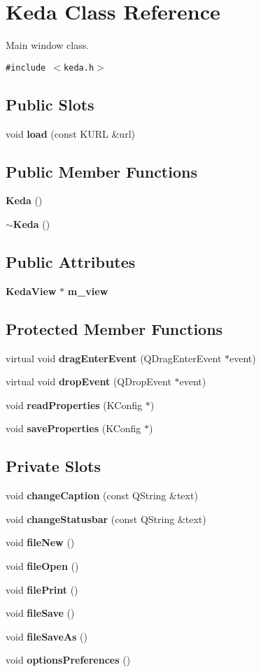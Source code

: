 \section{Keda Class Reference}
\label{classKeda}
Main window class.  


{\tt \#include $<$keda.h$>$}

\subsection*{Public Slots}
\begin{CompactItemize}
\item 
void {\bf load} (const KURL \&url)
\end{CompactItemize}
\subsection*{Public Member Functions}
\begin{CompactItemize}
\item 
{\bf Keda} ()
\item 
{\bf $\sim$Keda} ()
\end{CompactItemize}
\subsection*{Public Attributes}
\begin{CompactItemize}
\item 
{\bf Keda\-View} $\ast$ {\bf m\_\-view}
\end{CompactItemize}
\subsection*{Protected Member Functions}
\begin{CompactItemize}
\item 
virtual void {\bf drag\-Enter\-Event} (QDrag\-Enter\-Event $\ast$event)
\item 
virtual void {\bf drop\-Event} (QDrop\-Event $\ast$event)
\item 
void {\bf read\-Properties} (KConfig $\ast$)
\item 
void {\bf save\-Properties} (KConfig $\ast$)
\end{CompactItemize}
\subsection*{Private Slots}
\begin{CompactItemize}
\item 
void {\bf change\-Caption} (const QString \&text)
\item 
void {\bf change\-Statusbar} (const QString \&text)
\item 
void {\bf file\-New} ()
\item 
void {\bf file\-Open} ()
\item 
void {\bf file\-Print} ()
\item 
void {\bf file\-Save} ()
\item 
void {\bf file\-Save\-As} ()
\item 
void {\bf options\-Preferences} ()
\end{CompactItemize}
